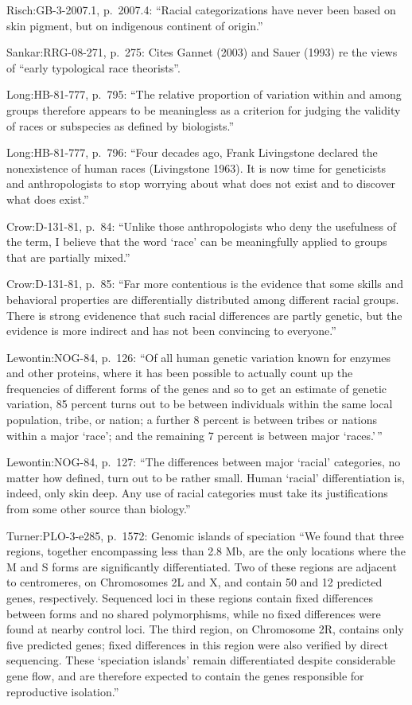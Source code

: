 \documentclass[11pt]{article}
\begin{document}
Risch:GB-3-2007.1, p.~2007.4: ``Racial categorizations have never
been based on skin pigment, but on indigenous continent of origin.''

Sankar:RRG-08-271, p.~275: Cites Gannet (2003) and Sauer (1993) re
the views of ``early typological race theorists''.

Long:HB-81-777, p.~795: ``The relative proportion of variation within
and among groups therefore appears to be meaningless as a criterion
for judging the validity of races or subspecies as defined by
biologists.''

Long:HB-81-777, p.~796: ``Four decades ago, Frank Livingstone
declared the nonexistence of human races (Livingstone 1963). It is
now time for geneticists and anthropologists to stop worrying about
what does not exist and to discover what does exist.''

Crow:D-131-81, p.~84: ``Unlike those anthropologists who deny the
usefulness of the term, I believe that the word `race' can be
meaningfully applied to groups that are partially mixed.''

Crow:D-131-81, p.~85: ``Far more contentious is the evidence that
some skills and behavioral properties are differentially distributed
among different racial groups. There is strong evidenence that such
racial differences are partly genetic, but the evidence is more
indirect and has not been convincing to everyone.''

Lewontin:NOG-84, p.~126: ``Of all human genetic variation known for
enzymes and other proteins, where it has been possible to actually
count up the frequencies of different forms of the genes and so to
get an estimate of genetic variation, 85 percent turns out to be
between individuals within the same local population, tribe, or
nation; a further 8 percent is between tribes or nations within a
major `race'; and the remaining 7 percent is between major `races.'\,''

Lewontin:NOG-84, p.~127: ``The differences between major `racial'
categories, no matter how defined, turn out to be rather
small. Human `racial' differentiation is, indeed, only skin
deep. Any use of racial categories must take its justifications from
some other source than biology.''

Turner:PLO-3-e285, p.~1572: Genomic islands of speciation ``We found
that three regions, together encompassing less than 2.8 Mb, are the
only locations where the M and S forms are significantly
differentiated. Two of these regions are adjacent to centromeres, on
Chromosomes 2L and X, and contain 50 and 12 predicted genes,
respectively. Sequenced loci in these regions contain fixed
differences between forms and no shared polymorphisms, while no
fixed differences were found at nearby control loci. The third
region, on Chromosome 2R, contains only five predicted genes; fixed
differences in this region were also verified by direct
sequencing. These `speciation islands' remain differentiated despite
considerable gene flow, and are therefore expected to contain the
genes responsible for reproductive isolation.''
\end{document}
